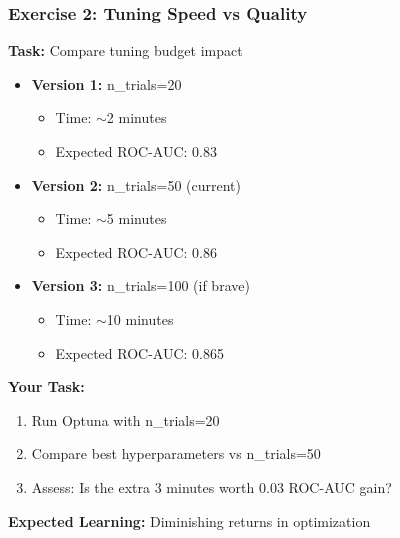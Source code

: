 \documentclass{beamer}
\begin{document}
\begin{frame}[fragile]
\frametitle{Exercise 2: Tuning Speed vs Quality}

\textbf{Task:} Compare tuning budget impact

\begin{itemize}
    \item \textbf{Version 1:} n\_trials=20
    \begin{itemize}
        \item Time: $\sim$2 minutes
        \item Expected ROC-AUC: 0.83
    \end{itemize}

    \vspace{0.2cm}
    \item \textbf{Version 2:} n\_trials=50 (current)
    \begin{itemize}
        \item Time: $\sim$5 minutes
        \item Expected ROC-AUC: 0.86
    \end{itemize}

    \vspace{0.2cm}
    \item \textbf{Version 3:} n\_trials=100 (if brave)
    \begin{itemize}
        \item Time: $\sim$10 minutes
        \item Expected ROC-AUC: 0.865
    \end{itemize}
\end{itemize}

\vspace{0.3cm}
\textbf{Your Task:}

\begin{enumerate}
    \item Run Optuna with n\_trials=20
    \item Compare best hyperparameters vs n\_trials=50
    \item Assess: Is the extra 3 minutes worth 0.03 ROC-AUC gain?
\end{enumerate}

\vspace{0.2cm}
\textbf{Expected Learning:} Diminishing returns in optimization

\end{frame}
\end{document}
